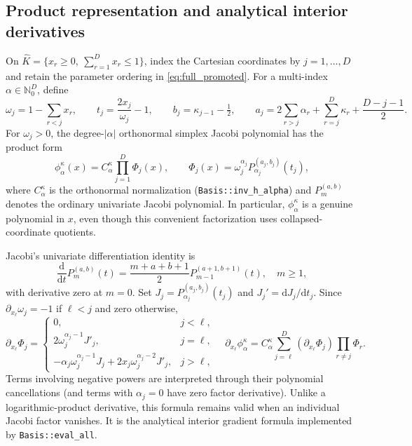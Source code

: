\documentclass[11pt]{article}
\begin{document}
\subsection{Product representation and analytical interior derivatives}
\label{sec:full_basis_grad}
On $\widehat K=\{x_r\ge0,\ \sum_{r=1}^D x_r\le1\}$, index the
Cartesian coordinates by $j=1,\ldots,D$ and retain the parameter
ordering in \eqref{eq:full_promoted}.  For a multi-index
$\alpha\in\mathbb N_0^D$, define
\begin{equation}\label{eq:full_stick_basis}
 \omega_j=1-\sum_{r<j}x_r,\qquad
 t_j=\frac{2x_j}{\omega_j}-1,\qquad
 b_j=\kappa_{j-1}-\tfrac12,\qquad
 a_j=2\sum_{r>j}\alpha_r+
   \sum_{r=j}^{D}\kappa_r+\frac{D-j-1}{2}.
\end{equation}
For $\omega_j>0$, the degree-$|\alpha|$ orthonormal simplex Jacobi
polynomial has the product form
\begin{equation}\label{eq:full_jacobi_product}
 \phi_\alpha^\kappa(x)=C_\alpha^\kappa
 \prod_{j=1}^D\Phi_j(x),\qquad
 \Phi_j(x)=\omega_j^{\alpha_j}
 P_{\alpha_j}^{(a_j,b_j)}(t_j),
\end{equation}
where $C_\alpha^\kappa$ is the orthonormal normalization
(\texttt{Basis::inv\_h\_alpha}) and $P_m^{(a,b)}$ denotes the
ordinary univariate Jacobi polynomial.  In particular, $\phi_\alpha^
\kappa$ is a genuine polynomial in $x$, even though this convenient
factorization uses collapsed-coordinate quotients.

Jacobi's univariate differentiation identity is
\begin{equation}\label{eq:full_univ_jacobi_deriv}
 \frac{\mathrm d}{\mathrm dt}P_m^{(a,b)}(t)
 =\frac{m+a+b+1}{2}P_{m-1}^{(a+1,b+1)}(t),\quad m\ge1,
\end{equation}
with derivative zero at $m=0$.  Set
$J_j=P_{\alpha_j}^{(a_j,b_j)}(t_j)$ and $J_j'=\mathrm dJ_j/\mathrm dt_j$.
Since $\partial_{x_\ell}\omega_j=-1$ if $\ell<j$ and zero otherwise,
\begin{equation}\label{eq:full_eval_grad_factor}
 \partial_{x_\ell}\Phi_j=
 \begin{cases}
 0,& j<\ell,\\
 2\omega_j^{\alpha_j-1}J'_j,&j=\ell,\\
 -\alpha_j\omega_j^{\alpha_j-1}J_j
  +2x_j\omega_j^{\alpha_j-2}J'_j,&j>\ell,
 \end{cases}
 \quad
 \partial_{x_\ell}\phi_\alpha^\kappa
 =C_\alpha^\kappa\sum_{j=\ell}^{D}
 (\partial_{x_\ell}\Phi_j)\prod_{r\ne j}\Phi_r.
\end{equation}
Terms involving negative powers are interpreted through their
polynomial cancellations (and terms with $\alpha_j=0$ have zero
factor derivative).  Unlike a logarithmic-product derivative, this
formula remains valid when an individual Jacobi factor vanishes.
It is the analytical interior gradient formula implemented by
\texttt{Basis::eval\_all}.
\end{document}
